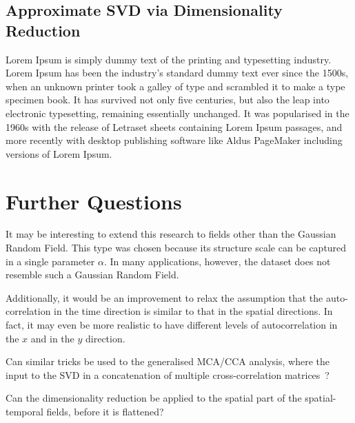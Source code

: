 \documentclass{acm_proc_article-sp}
\begin{document}
\subsection{Approximate SVD via Dimensionality Reduction}
\label{sec:Applications Approximate SVD via Dimensionality Reduction}

Lorem Ipsum is simply dummy text of the printing and typesetting industry. Lorem Ipsum has been the industry's standard dummy text ever since the 1500s, when an unknown printer took a galley of type and scrambled it to make a type specimen book. It has survived not only five centuries, but also the leap into electronic typesetting, remaining essentially unchanged. It was popularised in the 1960s with the release of Letraset sheets containing Lorem Ipsum passages, and more recently with desktop publishing software like Aldus PageMaker including versions of Lorem Ipsum.

\section{Further Questions}
\label{Further Questions}

It may be interesting to extend this research to fields other than the Gaussian Random Field. This type was chosen because its structure scale can be captured in a single parameter $\alpha$. In many applications, however, the dataset does not resemble such a Gaussian Random Field.

Additionally, it would be an improvement to relax the assumption that the auto-correlation in the time direction is similar to that in the spatial directions. In fact, it may even be more realistic to have different levels of autocorrelation in the $x$ and in the $y$ direction.

Can similar tricks be used to the generalised MCA/CCA analysis, where the input to the SVD in a concatenation of multiple cross-correlation matrices~\cite{Carroll1970, Kettenring1971}?

Can the dimensionality reduction be applied to the spatial part of the spatial-temporal fields, before it is flattened?

{
\footnotesize


}
\end{document}
